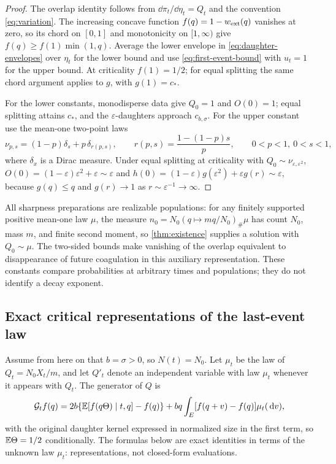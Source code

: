 \begin{proof}
The overlap identity follows from $\dd\pi_t/\dd\eta_t=Q_t$ and the
convention \eqref{eq:variation}. The increasing concave function
$f(q)=1-w_{\rm ext}(q)$ vanishes at zero, so its chord on $[0,1]$ and
monotonicity on $[1,\infty)$ give $f(q)\geq f(1)\min(1,q)$. Average
the lower envelope in \eqref{eq:daughter-envelopes} over $\eta_t$ for
the lower bound and use \eqref{eq:first-event-bound} with $u_t=1$ for
the upper bound. At criticality $f(1)=1/2$; for equal splitting the
same chord argument applies to $g$, with $g(1)=c_*$.

For the lower constants, monodisperse data give $Q_0=1$ and $O(0)=1$;
equal splitting attains $c_*$, and the $\varepsilon$-daughters
approach $c_{b,\sigma}$. For the upper constant use the mean-one
two-point laws
\begin{equation}
 \nu_{p,s}=(1-p)\delta_s+p\,\delta_{r(p,s)},\qquad
 r(p,s)=\frac{1-(1-p)s}p,\qquad 0<p<1,\ 0<s<1,
 \label{eq:two-point-family}
\end{equation}
where $\delta_x$ is a Dirac measure. Under equal splitting at
criticality with $Q_0\sim\nu_{\varepsilon,\varepsilon^2}$,
$O(0)=(1-\varepsilon)\varepsilon^2+\varepsilon\sim\varepsilon$ and
$h(0)=(1-\varepsilon)g(\varepsilon^2)+\varepsilon g(r)\sim\varepsilon$,
because $g(q)\leq q$ and $g(r)\to1$ as $r\sim\varepsilon^{-1}\to\infty$.
\end{proof}

All sharpness preparations are realizable populations: for any
finitely supported positive mean-one law $\mu$, the measure
$n_0=N_0(q\mapsto mq/N_0)_\#\mu$ has count $N_0$, mass $m$, and finite
second moment, so \cref{thm:existence} supplies a solution with
$Q_0\sim\mu$. The two-sided bounds make vanishing of the overlap
equivalent to disappearance of future coagulation in this auxiliary
representation. These constants compare probabilities at arbitrary
times and populations; they do not identify a decay exponent.

\subsection{Exact critical representations of the last-event law}
\label{sec:critical-last-event}

Assume from here on that $b=\sigma>0$, so $N(t)=N_0$. Let $\mu_t$ be
the law of $Q_t=N_0X_t/m$, and let $Q'_t$ denote an independent
variable with law $\mu_t$ whenever it appears with $Q_t$. The
generator of $Q$ is
\begin{equation}
 \mathcal G_t f(q)=2b\{\mathbb E[f(q\Theta)\mid t,q]-f(q)\}
       +bq\int_E[f(q+v)-f(q)]\mu_t(\,\mathrm d v),
 \label{eq:critical-Q-generator}
\end{equation}
with the original daughter kernel expressed in normalized size in the
first term, so $\mathbb E\Theta=1/2$ conditionally. The formulas below are
exact identities in terms of the unknown law $\mu_t$: representations,
not closed-form evaluations.

